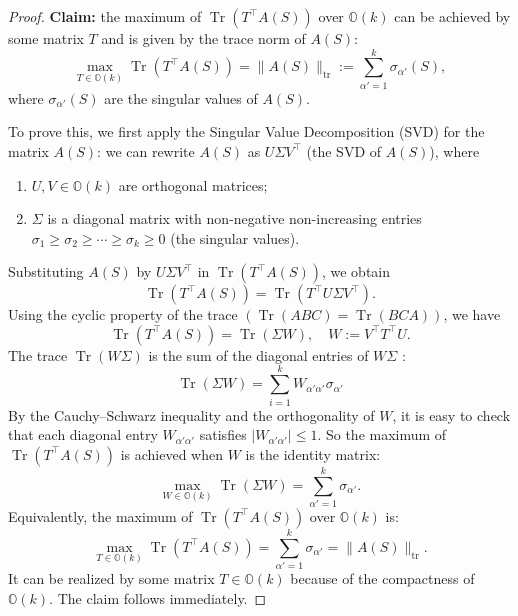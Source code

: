 \documentclass[11pt,letterpaper]{amsart}
\theoremstyle{definition}
\theoremstyle{remark}
\numberwithin{equation}{section}
\begin{document}
\begin{proof}
\textbf{Claim:} the maximum of $\operatorname{Tr}\left(T^{\top} A(S)\right)$ over $ \mathbb{O}(k)$ can be achieved by some matrix $T$ and is given by the trace norm of $A(S)$: 
\begin{equation*}
\max _{T \in \mathbb{O}(k)} \operatorname{Tr}\left(T^{\top} A(S)\right)=\|A(S)\|_{\mathrm{tr}}:=\sum_{\alpha'=1}^{k} \sigma_{\alpha'}(S),    
\end{equation*}
where $\sigma_{\alpha'}(S)$ are the singular values of $A(S)$.

To prove this, we first apply the Singular Value Decomposition (SVD) for the matrix $A(S)$:
we can rewrite $A(S)$ as $U \Sigma V^{\top}$ (the SVD of $A(S)$), where
\begin{enumerate}
    \item $U, V \in \mathbb{O}(k)$ are orthogonal matrices;
    \item  $\Sigma$ is a diagonal matrix with non-negative non-increasing entries $\sigma_1 \geqslant  \sigma_2 \geqslant \cdots \geqslant \sigma_k \geqslant 0$ (the singular values).
\end{enumerate}
Substituting $A(S)$ by $U \Sigma V^{\top}$ in $\operatorname{Tr}\left(T^{\top} A(S)\right)$, we obtain
\begin{equation}
\operatorname{Tr}\left(T^{\top} A(S)\right)=\operatorname{Tr}\left(T^{\top} U \Sigma V^{\top}\right). 
\end{equation}
Using the cyclic property of the trace $(\operatorname{Tr}(A B C)=\operatorname{Tr}(B C A))$, we have 
\begin{equation}
\operatorname{Tr}\left(T^{\top} A(S)\right)=\operatorname{Tr}(\Sigma W), \quad W:=V^{\top} T^{\top} U.
\end{equation}
The trace $\operatorname{Tr}(W \Sigma)$ is the sum of the diagonal entries of $W \Sigma$ :
\begin{equation}
\operatorname{Tr}( \Sigma W)=\sum_{i=1}^k W_{\alpha' \alpha'} \sigma_{\alpha'}  
\end{equation}
By the Cauchy--Schwarz inequality and the orthogonality of $W$, it is easy to check that each diagonal entry $W_{\alpha' \alpha'}$ satisfies $\left|W_{\alpha' \alpha'}\right| \leqslant 1$. So the maximum of $\operatorname{Tr}\left(T^{\top} A(S)\right)$ is achieved when $W$ is the identity matrix:
\begin{equation}
\max _{W \in \mathbb{O}(k)} \operatorname{Tr}( \Sigma W)=\sum_{\alpha'=1}^k \sigma_{\alpha'} . 
\end{equation}
Equivalently, the maximum of $\operatorname{Tr}\left(T^{\top} A(S)\right)$ over $\mathbb{O}(k)$ is:
\begin{equation}
\max _{T \in \mathbb{O}(k)} \operatorname{Tr}\left(T^{\top} A(S)\right)=\sum_{\alpha'=1}^k \sigma_{\alpha'}=\|A(S)\|_{\mathrm{tr}}. 
\end{equation}
It can be realized by some matrix $T \in \mathbb{O}(k)$ because of the compactness of $\mathbb{O}(k)$.
The claim follows immediately.


\end{proof}
\end{document}
